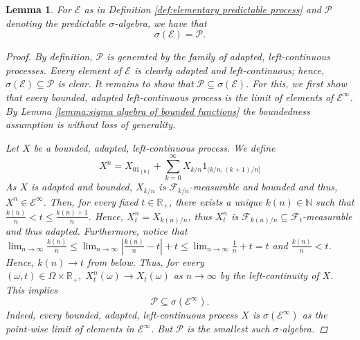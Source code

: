 \documentclass[11pt,a4paper,twoside,openany]{report}
\numberwithin{equation}{section}
\theoremstyle{plain} %
\newtheorem{lemma}[theorem]{Lemma}
\theoremstyle{definition} %
\theoremstyle{remark} %
\begin{document}
\begin{lemma}\label{lemma:elementary processes generated predictable sigma algebra}
    For \(\mathcal{E}\) as in Definition \ref{def:elementary predictable process} and \(\mathcal{P}\) denoting the predictable \(\sigma\)-algebra, we have that 
    \begin{equation*}
        \sigma(\mathcal{E})=\mathcal{P}.
    \end{equation*}
    \begin{proof}
        By definition, \(\mathcal{P}\) is generated by the family of adapted, left-continuous processes. Every element of \(\mathcal{E}\) is clearly adapted and left-continuous; hence, \(\sigma(\mathcal{E})\subseteq\mathcal{P}\) is clear. It remains to show that \(\mathcal{P}\subseteq\sigma(\mathcal{E})\). For this, we first show that every bounded, adapted left-continuous process is the limit of elements of \(\mathcal{E}^{\infty}\). By Lemma \ref{lemma:sigma algebra of bounded functions} the boundedness assumption is without loss of generality.
        
        
           Let \(X\) be a bounded, adapted, left-continuous process. We define
        \begin{equation}\label{eq:approximating adapted left-continuous process}
            X^n= X_01_{\left\{0\right\}}+\sum_{k=0}^\infty X_{k/n}1_{(k/n,(k+1)/n]}
        \end{equation}
        As \(X\) is adapted and bounded, \(X_{k/n}\) is \(\mathcal{F}_{k/n}\)-measurable and bounded and thus, \(X^n\in\mathcal{E}^{\infty}\). Then, for every fixed \(t\in\mathbb{R}_+\), there exists a unique \(k(n)\in\mathbb{N}\) such that \(\frac{k(n)}{n}<t\leq \frac{k(n)+1}{n}\). Hence, \(X_t^n=X_{k(n)/n}\), thus \(X_t^n\) is \(\mathcal{F}_{k(n)/n}\subseteq\mathcal{F}_t\)-measurable and thus adapted. Furthermore, notice that \(\lim_{n\to\infty}\frac{k(n)}{n}\leq\lim_{n\to\infty}|\frac{k(n)}{n}-t|+t\leq\lim_{n\to\infty}\frac{1}{n}+t=t\) and \(\frac{k(n)}{n}<t\). Hence, \(k(n)\to t\) from below. Thus, for every \((\omega,t)\in\Omega\times\mathbb{R}_+,\;X^n_t(\omega)\to X_t(\omega)\) as \(n\to\infty\) by the left-continuity of \(X\). This implies 
        \begin{equation*}
            \mathcal{P}\subseteq\sigma(\mathcal{E}^{\infty}).
        \end{equation*}
        Indeed, every bounded, adapted, left-continuous process \(X\) is \(\sigma(\mathcal{E}^{\infty})\) as the point-wise limit of elements in \(\mathcal{E}^{\infty}\). But \(\mathcal{P}\) is the smallest such \(\sigma\)-algebra.




\end{proof}
\end{lemma}
\end{document}
